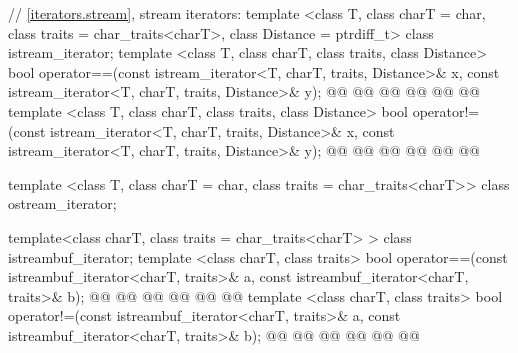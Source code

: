 \begin{codeblock}
  // \ref{iterators.stream}, stream iterators:
  template <class T, class charT = char, class traits = char_traits<charT>,
      class Distance = ptrdiff_t>
  class istream_iterator;
  template <class T, class charT, class traits, class Distance>
    bool operator==(const istream_iterator<T, charT, traits, Distance>& x,
            const istream_iterator<T, charT, traits, Distance>& y);
  @@
    @@
            @@
  @@
    @@
            @@
  template <class T, class charT, class traits, class Distance>
    bool operator!=(const istream_iterator<T, charT, traits, Distance>& x,
            const istream_iterator<T, charT, traits, Distance>& y);
  @@
    @@
            @@
  @@
    @@
            @@

  template <class T, class charT = char, class traits = char_traits<charT>>
      class ostream_iterator;

  template<class charT, class traits = char_traits<charT> >
    class istreambuf_iterator;
  template <class charT, class traits>
    bool operator==(const istreambuf_iterator<charT, traits>& a,
            const istreambuf_iterator<charT, traits>& b);
  @@
    @@
            @@
  @@
    @@
            @@
  template <class charT, class traits>
    bool operator!=(const istreambuf_iterator<charT, traits>& a,
            const istreambuf_iterator<charT, traits>& b);
  @@
    @@
            @@
  @@
    @@
            @@


\end{codeblock}
